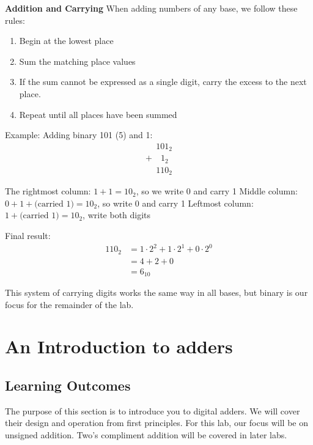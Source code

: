 \documentclass[12pt]{labmanual}
\begin{document}
\noindent\textbf{Addition and Carrying}\hfill\break
When adding numbers of any base, we follow these rules:
\begin{enumerate}
    \item Begin at the lowest place
    \item Sum the matching place values
    \item If the sum cannot be expressed as a single digit, carry the excess to the next place.
    \item Repeat until all places have been summed
\end{enumerate}

Example: Adding binary 101 (5) and 1:
\begin{equation*}
\begin{array}{r}
  \phantom{+}101_2\\
  +\phantom{10}1_2\\\hline
  \phantom{+}110_2
\end{array}
\end{equation*}

The rightmost column: $1 + 1 = 10_2$, so we write 0 and carry 1
Middle column: $0 + 1 + \text{(carried 1)} = 10_2$, so write 0 and carry 1
Leftmost column: $1 + \text{(carried 1)} = 10_2$, write both digits

Final result:
\begin{align*}    
110_2 &= 1 \cdot 2^2 + 1 \cdot 2^1 + 0 \cdot 2^0 \\
&= 4 + 2 + 0 \\
&= 6_{10}
\end{align*}

This system of carrying digits works the same way in all bases, but binary is our focus for the remainder of the lab.

\label{sec:review}

\section{An Introduction to adders}

\subsection{Learning Outcomes}
The purpose of this section is to introduce you to digital adders. We will cover their design and operation from first principles. For this lab, our focus will be on unsigned addition. Two's compliment addition will be covered in later labs.
\end{document}
